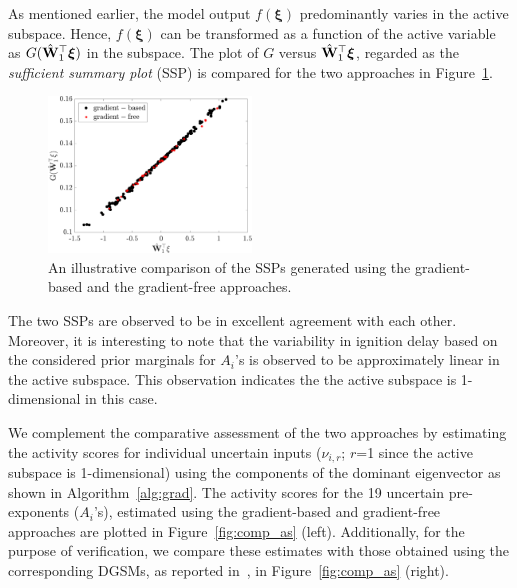 As mentioned earlier, the model output $f(\bm{\xi})$ predominantly varies in the active subspace. Hence, 
$f(\bm{\xi})$ can be transformed as a function of the active variable as $G(\hat{\mathbf{{W}}}_1^\top\bm{\xi})$ in
the subspace. The plot of $G$ versus $\hat{\mathbf{{W}}}_1^\top\bm{\xi}$, regarded as the \textit{sufficient summary plot} (SSP) is 
compared for the two approaches in Figure~\ref{fig:comp_ssp}.
%
\begin{figure}[htbp]
 \begin{center}
  \includegraphics[width=0.48\textwidth]{./Figures/comp_ssp}
\caption{An illustrative comparison of the SSPs generated using the gradient-based and the gradient-free approaches.}
\label{fig:comp_ssp}
\end{center}
\end{figure}
%
The two SSPs are observed to be in excellent agreement with each other. Moreover, it is interesting to note
that the variability in ignition
delay based on the considered prior marginals for $A_i$'s is observed to be approximately linear in the
active subspace. This observation indicates the the active subspace is 1-dimensional in this case.

We complement the comparative assessment of the two approaches by estimating
the activity scores for individual uncertain inputs ($\nu_{i,r}$; $r$=1 since the
active subspace is 1-dimensional)
using the components of the dominant eigenvector as shown in Algorithm~\ref{alg:grad}.
The activity scores for the 19 uncertain pre-exponents ($A_i$'s), estimated
using the gradient-based and gradient-free approaches are plotted in
Figure~\ref{fig:comp_as} (left).  Additionally, for the purpose of
verification, we compare these estimates with those obtained using the
corresponding DGSMs, as reported in~\cite{Vohra:2018}, in
Figure~\ref{fig:comp_as} (right). 

